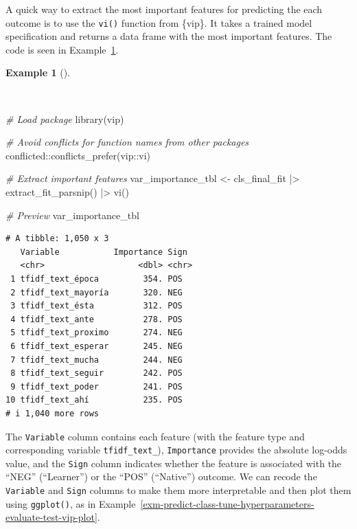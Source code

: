\documentclass[
  letterpaper,
]{latex/krantz}
\newenvironment{Shaded}{\begin{snugshade}}{\end{snugshade}}
\newcommand{\CommentTok}[1]{\textcolor[rgb]{0.00,0.00,0.00}{\textit{#1}}}
\newcommand{\FunctionTok}[1]{\textcolor[rgb]{0.00,0.00,0.00}{#1}}
\newcommand{\NormalTok}[1]{\textcolor[rgb]{0.00,0.00,0.00}{#1}}
\newcommand{\OtherTok}[1]{\textcolor[rgb]{0.00,0.00,0.00}{#1}}
\newcommand{\SpecialCharTok}[1]{\textcolor[rgb]{0.00,0.00,0.00}{#1}}
\theoremstyle{definition}
\newtheorem{example}{Example}[chapter]
\theoremstyle{remark}
\begin{document}
A quick way to extract the most important features for predicting the
each outcome is to use the \texttt{vi()} function from \{vip\}. It takes
a trained model specification and returns a data frame with the most
important features. The code is seen in
Example~\ref{exm-predict-class-tune-hyperparameters-evaluate-test-vip}.

\begin{example}[]\protect\hypertarget{exm-predict-class-tune-hyperparameters-evaluate-test-vip}{}\label{exm-predict-class-tune-hyperparameters-evaluate-test-vip}

~

\begin{Shaded}
\begin{Highlighting}[]
\CommentTok{\# Load package}
\FunctionTok{library}\NormalTok{(vip)}

\CommentTok{\# Avoid conflicts for function names from other packages}
\NormalTok{conflicted}\SpecialCharTok{::}\FunctionTok{conflicts\_prefer}\NormalTok{(vip}\SpecialCharTok{::}\NormalTok{vi)}

\CommentTok{\# Extract important features}
\NormalTok{var\_importance\_tbl }\OtherTok{\textless{}{-}}
\NormalTok{  cls\_final\_fit }\SpecialCharTok{|\textgreater{}}
  \FunctionTok{extract\_fit\_parsnip}\NormalTok{() }\SpecialCharTok{|\textgreater{}}
  \FunctionTok{vi}\NormalTok{()}

\CommentTok{\# Preview}
\NormalTok{var\_importance\_tbl}
\end{Highlighting}
\end{Shaded}

\begin{verbatim}
# A tibble: 1,050 x 3
   Variable           Importance Sign 
   <chr>                   <dbl> <chr>
 1 tfidf_text_época         354. POS  
 2 tfidf_text_mayoría       320. NEG  
 3 tfidf_text_ésta          312. POS  
 4 tfidf_text_ante          278. POS  
 5 tfidf_text_proximo       274. NEG  
 6 tfidf_text_esperar       245. NEG  
 7 tfidf_text_mucha         244. NEG  
 8 tfidf_text_seguir        242. POS  
 9 tfidf_text_poder         241. POS  
10 tfidf_text_ahí           235. POS  
# i 1,040 more rows
\end{verbatim}

\end{example}

The \texttt{Variable} column contains each feature (with the feature
type and corresponding variable \texttt{tfidf\_text\_}),
\texttt{Importance} provides the absolute log-odds value, and the
\texttt{Sign} column indicates whether the feature is associated with
the ``NEG'' (``Learner'') or the ``POS'' (``Native'') outcome. We can
recode the \texttt{Variable} and \texttt{Sign} columns to make them more
interpretable and then plot them using \texttt{ggplot()}, as in
Example~\ref{exm-predict-class-tune-hyperparameters-evaluate-test-vip-plot}.
\end{document}
